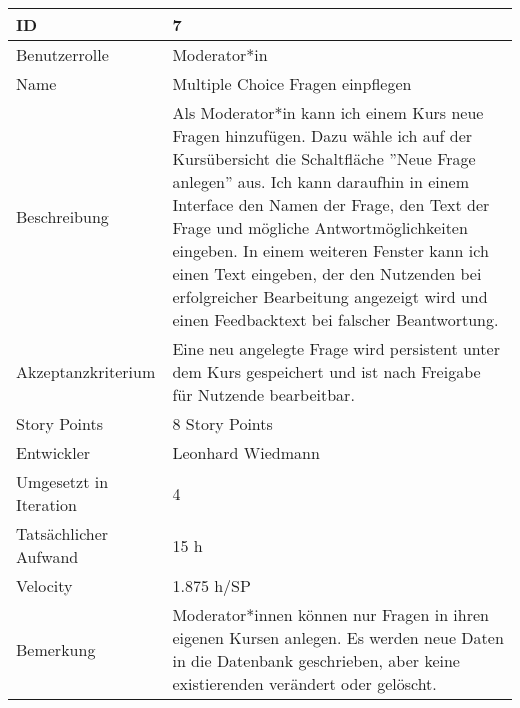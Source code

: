 \begin{tabularx}{\textwidth}{|p{}|X|}
	\hline
	ID & 7\\
	\hline
	Benutzerrolle & Moderator*in\\
	\hline
	Name & Multiple Choice Fragen einpflegen\\
	\hline
	Beschreibung & Als Moderator*in kann ich einem Kurs neue Fragen hinzufügen. Dazu wähle ich auf der Kursübersicht die Schaltfläche ''Neue Frage anlegen'' aus. Ich kann daraufhin in einem Interface den Namen der Frage, den Text der Frage und mögliche Antwortmöglichkeiten eingeben. In einem weiteren Fenster kann ich einen Text eingeben, der den Nutzenden bei erfolgreicher Bearbeitung angezeigt wird und einen Feedbacktext bei falscher Beantwortung.\\
	\hline
	Akzeptanzkriterium & Eine neu angelegte Frage wird persistent unter dem Kurs gespeichert und ist nach Freigabe für Nutzende bearbeitbar.\\
	\hline
	Story Points & 8 Story Points\\
	\hline
	Entwickler & Leonhard Wiedmann\\
	\hline
	Umgesetzt in Iteration & 4\\
	\hline
	Tatsächlicher Aufwand & 15 h\\
	\hline
	Velocity & 1.875 h/SP\\
	\hline
	Bemerkung & Moderator*innen können nur Fragen in ihren eigenen Kursen anlegen. Es werden neue Daten in die Datenbank geschrieben, aber keine existierenden verändert oder gelöscht.\\
	\hline
\end{tabularx}
\vspace{20pt}

